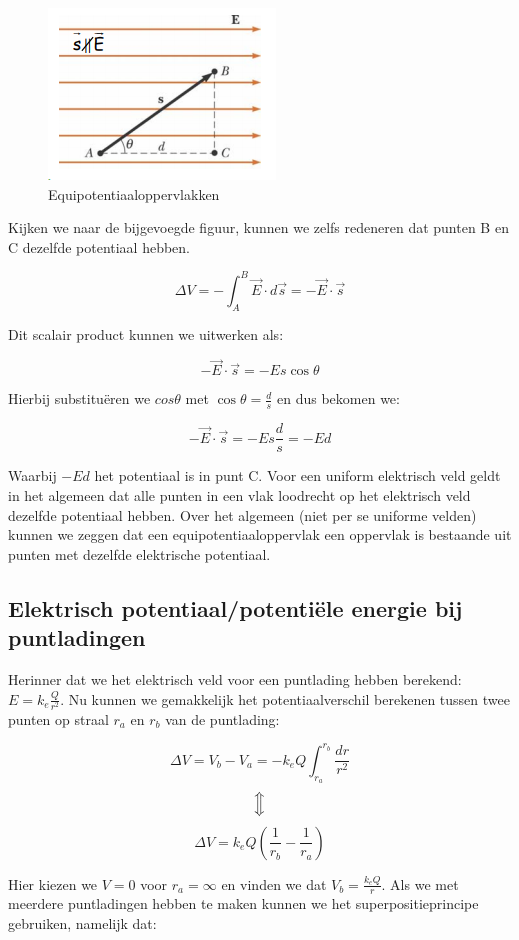 \documentclass[12pt,a4paper]{article}
\newcommand{\Luda}{\Big\Updownarrow}
\begin{document}
    \begin{figure}[h]
    	\centering
	\includegraphics[width=0.4\linewidth]{equipot_oppervlakken}
    	\caption{Equipotentiaaloppervlakken}
        	\label{equipot_opp}
    \end{figure}
    
    Kijken we naar de bijgevoegde figuur, kunnen we zelfs redeneren dat punten B en C dezelfde potentiaal hebben. 
    
    $$\Delta V = -\int_{A}^{B} \vec{E} \cdot d\vec{s} = -\vec{E} \cdot \vec{s}$$
    
    Dit scalair product kunnen we uitwerken als:
    
    $$-\vec{E} \cdot \vec{s} = -Es\cos{\theta}$$
    
    Hierbij substituëren we $cos{\theta}$ met $\cos{\theta} = \frac{d}{s}$ en dus bekomen we:
    
    $$-\vec{E} \cdot \vec{s} = -Es\frac{d}{s} = -Ed$$
    
    Waarbij $-Ed$ het potentiaal is in punt C. Voor een uniform elektrisch veld geldt in het algemeen dat
    alle punten in een vlak loodrecht op het elektrisch veld dezelfde potentiaal hebben. Over het algemeen (niet
    per se uniforme velden) kunnen we zeggen dat een equipotentiaaloppervlak een oppervlak is bestaande uit
    punten met dezelfde elektrische potentiaal.
    
    \subsection{Elektrisch potentiaal/potentiële energie bij puntladingen}
    Herinner dat we het elektrisch veld voor een puntlading hebben berekend: $E = k_{e} \frac{Q}{r^{2}}$. Nu kunnen we
    gemakkelijk het potentiaalverschil berekenen tussen twee punten op straal $r_{a}$ en $r_{b}$ van de puntlading: 
    
    $$\Delta V = V_{b} - V_{a} = -k_{e}Q\int_{r_a}^{r_b} \frac{dr}{r^{2}}$$
    $$\Luda$$
    $$\Delta V = k_{e}Q \left( \frac{1}{r_{b}} - \frac{1}{r_{a}} \right)$$
    
    Hier kiezen we $V = 0$ voor $r_{a} = \infty$ en vinden we dat $V_{b} = \frac{k_{e}Q}{r}$. Als we met
    meerdere puntladingen hebben te maken kunnen we het superpositieprincipe gebruiken, namelijk dat:
    
\end{document}
